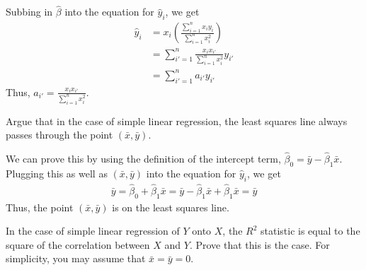 \documentclass{article}
\begin{document}
\begin{probset}
\begin{prob}
    \begin{soln}
        Subbing in $\hat{\beta}$ into the equation for $\hat{y}_i$, we get
        \begin{align*}
            \hat{y}_i &= x_i \left(\frac{\sum_{i=1}^n x_i y_i}{\sum_{i=1}^n x_i^2}\right) \\
            &= \sum_{i'=1}^n \frac{x_i x_{i'}}{\sum_{i=1}^n x_i^2} y_{i'} \\
            &= \sum_{i'=1}^n a_{i'} y_{i'}
        \end{align*}
        Thus, $a_{i'} = \displaystyle\frac{x_i x_{i'}}{\sum_{i=1}^n x_i^2}$.
    \end{soln}
\end{prob}

\begin{prob}
    Argue that in the case of simple linear regression, the least squares line always passes through the point $(\bar{x}, \bar{y})$.

    \begin{soln}
        We can prove this by using the definition of the intercept term, $\hat{\beta}_0 = \bar{y} - \hat{\beta}_1 \bar{x}$. Plugging this as well as $(\bar{x}, \bar{y})$ into the equation for $\hat{y}_i$, we get
        \begin{align*}
            \bar{y} = \hat{\beta}_0 + \hat{\beta}_1 \bar{x} = \bar{y} - \hat{\beta}_1 \bar{x} + \hat{\beta}_1 \bar{x} = \bar{y}
        \end{align*}
        Thus, the point $(\bar{x}, \bar{y})$ is on the least squares line.
    \end{soln}
\end{prob}

\newpage

\begin{prob}
    In the case of simple linear regression of $Y$ onto $X$, the $R^2$ statistic is equal to the square of the correlation between $X$ and $Y$. Prove that this is the case. For simplicity, you may assume that $\bar{x} = \bar{y} = 0$.


\end{prob}
\end{probset}
\end{document}
